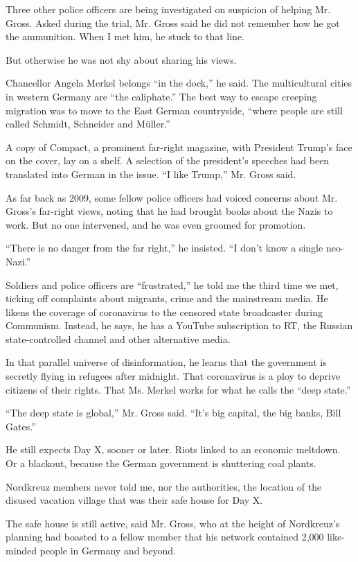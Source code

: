 Three other police officers are being investigated on suspicion of
helping Mr. Gross. Asked during the trial, Mr. Gross said he did not
remember how he got the ammunition. When I met him, he stuck to that
line.

But otherwise he was not shy about sharing his views.

Chancellor Angela Merkel belongs ``in the dock,'' he said. The
multicultural cities in western Germany are ``the caliphate.'' The best
way to escape creeping migration was to move to the East German
countryside, ``where people are still called Schmidt, Schneider and
Müller.''

A copy of Compact, a prominent far-right magazine, with President
Trump's face on the cover, lay on a shelf. A selection of the
president's speeches had been translated into German in the issue. ``I
like Trump,'' Mr. Gross said.

As far back as 2009, some fellow police officers had voiced concerns
about Mr. Gross's far-right views, noting that he had brought books
about the Nazis to work. But no one intervened, and he was even groomed
for promotion.

``There is no danger from the far right,'' he insisted. ``I don't know a
single neo-Nazi.''

Soldiers and police officers are ``frustrated,'' he told me the third
time we met, ticking off complaints about migrants, crime and the
mainstream media. He likens the coverage of coronavirus to the censored
state broadcaster during Communism. Instead, he says, he has a YouTube
subscription to RT, the Russian state-controlled channel and other
alternative media.

In that parallel universe of disinformation, he learns that the
government is secretly flying in refugees after midnight. That
coronavirus is a ploy to deprive citizens of their rights. That Ms.
Merkel works for what he calls the ``deep state.''

``The deep state is global,'' Mr. Gross said. ``It's big capital, the
big banks, Bill Gates.''

He still expects Day X, sooner or later. Riots linked to an economic
meltdown. Or a blackout, because the German government is shuttering
coal plants.

Nordkreuz members never told me, nor the authorities, the location of
the disused vacation village that was their safe house for Day X.

The safe house is still active, said Mr. Gross, who at the height of
Nordkreuz's planning had boasted to a fellow member that his network
contained 2,000 like-minded people in Germany and beyond.

